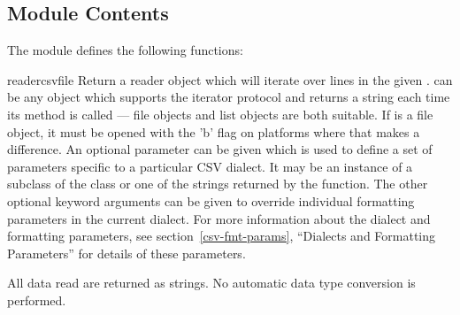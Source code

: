 \subsection{Module Contents \label{csv-contents}}

The  module defines the following functions:

\begin{funcdesc}{reader}{csvfile}
Return a reader object which will iterate over lines in the given
{}.   can be any object which supports the
iterator protocol and returns a string each time its 
method is called --- file objects and list objects are both suitable.  
If  is a file object, it must be opened with
the 'b' flag on platforms where that makes a difference.  An optional
{} parameter can be given
which is used to define a set of parameters specific to a particular CSV
dialect.  It may be an instance of a subclass of the 
class or one of the strings returned by the 
function.  The other optional {} keyword arguments can be
given to override individual formatting parameters in the current
dialect.  For more information about the dialect and formatting
parameters, see section~\ref{csv-fmt-params}, ``Dialects and Formatting
Parameters'' for details of these parameters.

All data read are returned as strings.  No automatic data type
conversion is performed.


\end{funcdesc}

